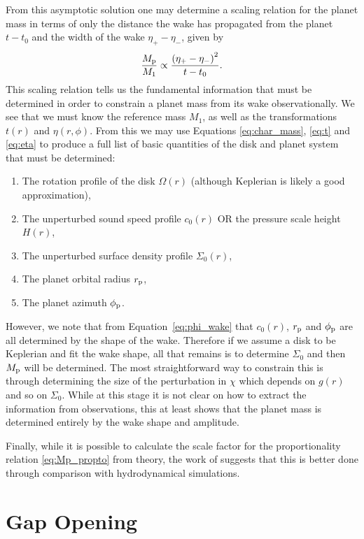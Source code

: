 From this asymptotic solution one may determine a scaling relation for the planet mass in terms of only the distance the wake has propagated from the planet $t-t_0$ and the width of the wake $\eta_+ - \eta_-$, given by 
\begin{align}
    \frac{M_{\rm p}}{M_1} \propto \frac{\left( \eta_+ - \eta_- \right)^2}{t - t_0}. \label{eq:Mp_propto}
\end{align}
This scaling relation tells us the fundamental information that must be determined in order to constrain a planet mass from its wake observationally.
We see that we must know the reference mass $M_1$, as well as the transformations $t(r)$ and $\eta(r,\phi)$.
From this we may use Equations \eqref{eq:char_mass}, \eqref{eq:t} and \eqref{eq:eta} to produce a full list of basic quantities of the disk and planet system that must be determined:
\begin{enumerate}
    \item The rotation profile of the disk $\Omega(r)$ (although Keplerian is likely a good approximation),
    \item The unperturbed sound speed profile $c_0(r)$ OR the pressure scale height $H(r)$,
    \item The unperturbed surface density profile $\Sigma_0(r)$,
    \item The planet orbital radius $r_{\rm p}$,
    \item The planet azimuth $\phi_{\rm p}$.
\end{enumerate}
However, we note that from Equation~\eqref{eq:phi_wake} that $c_0(r)$, $r_{\rm p}$ and $\phi_{\rm p}$ are all determined by the shape of the wake.
Therefore if we assume a disk to be Keplerian and fit the wake shape, all that remains is to determine $\Sigma_0$ and then $M_{\rm p}$ will be determined.
The most straightforward way to constrain this is through determining the size of the perturbation in $\chi$ which depends on $g(r)$ and so on $\Sigma_0$.
While at this stage it is not clear on how to extract the information from observations, this at least shows that the planet mass is determined entirely by the wake shape and amplitude.

Finally, while it is possible to calculate the scale factor for the proportionality relation \eqref{eq:Mp_propto} from theory, the work of \citet{cimerman2021} suggests that this is better done through comparison with hydrodynamical simulations.

\section{Gap Opening} \label{sec:gap_opening}

